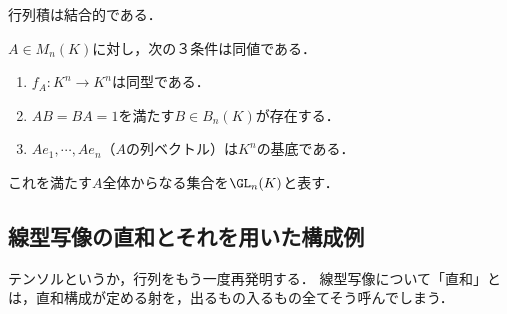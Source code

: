\documentclass[uplatex, dvipdfmx]{jsreport}
\begin{document}
\begin{corollary}
    行列積は結合的である．
\end{corollary}

\begin{proposition}[可逆行列]
    $A\in M_n(K)$に対し，次の３条件は同値である．
    \begin{enumerate}
        \item $f_A:K^n\to K^n$は同型である．
        \item $AB=BA=1$を満たす$B\in B_n(K)$が存在する．
        \item $Ae_1,\cdots,Ae_n$（$A$の列ベクトル）は$K^n$の基底である．
    \end{enumerate}
    これを満たす$A$全体からなる集合を$\GL_n(K)$と表す．
\end{proposition}

\subsection{線型写像の直和とそれを用いた構成例}

テンソルというか，行列をもう一度再発明する．
線型写像について「直和」とは，直和構成が定める射を，出るもの入るもの全てそう呼んでしまう．
\end{document}
